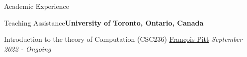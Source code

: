 \documentclass{resume} %
\begin{document}


\begin{rSection}{Academic Experience}
\begin{rSubsection}{Teaching Assistance}{\textcolor{Black!70}{\bf University of Toronto, Ontario, Canada}}{}{}
\begin{small}
\item Introduction to the theory of Computation (CSC236) \href{https://www.cs.toronto.edu/~fpitt/}{\underline{François Pitt}} \hfill \textcolor{Black!70}{\it September 2022 - Ongoing}
\end{small}
\end{rSubsection}


\end{rSection}
\end{document}

